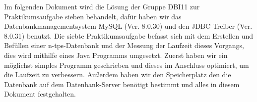 Im folgenden Dokument wird die Lösung der Gruppe DBI11 zur Praktikumsaufgabe sieben behandelt, dafür haben wir das Datenbankmanagementsystem MySQL (Ver. 8.0.30) und den JDBC Treiber (Ver. 8.0.31) benutzt.
Die siebte Praktikumsaufgabe befasst sich mit dem Erstellen und Befüllen einer n-tps-Datenbank und der Messung der Laufzeit dieses Vorgangs, dies wird mithilfe eines Java Programms umgesetzt.
Zuerst haben wir ein möglichst simples Programm geschrieben und dieses im Anschluss optimiert, um die Laufzeit zu verbessern.
Außerdem haben wir den Speicherplatz den die Datenbank auf dem Datenbank-Server benötigt bestimmt und alles in diesem Dokument festgehalten.